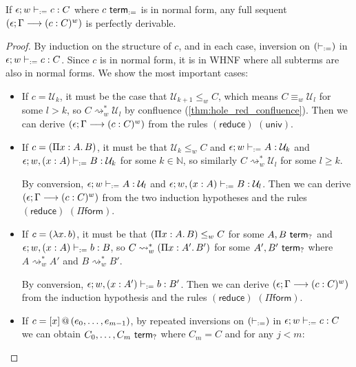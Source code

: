 \documentclass[twoside]{report}
\begin{document}
\begin{proposition}
    \label{thm:focused_calculus_completeness}
    If $\epsilon; w \vdash_{:=} c : C$ where $c \ \mathsf{term}_{:=}$ is in normal form, any full sequent $(\epsilon; \Gamma \longrightarrow (c : C)^w)$ is perfectly derivable.
\end{proposition}

\begin{proof}
    By induction on the structure of $c$, and in each case, inversion on $(\vdash_{:=})$ in $\epsilon; w \vdash_{:=} c : C$. Since $c$ is in normal form, it is in WHNF where all subterms are also in normal forms. We show the most important cases:

    \begin{itemize}
        \item If $c = \mathcal U_k$, it must be the case that $\mathcal U_{k + 1} \leq_w C$, which means $C \equiv_w \mathcal U_l$ for some $l > k$, so $C \rightsquigarrow_w^\ast \mathcal U_l$ by confluence (\cref{thm:hole_red_confluence}). Then we can derive $(\epsilon; \Gamma \longrightarrow (c : C)^w)$ from the rules $(\mathsf{reduce})$ $(\mathsf{univ})$.

        \item If $c = (\Pi{x} : {A}.\,{B})$, it must be that $\mathcal U_k \leq_w C$ and $\epsilon; w \vdash_{:=} A : \mathcal U_k$ and $\epsilon; w, (x : A) \vdash_{:=} B : \mathcal U_k$ for some $k \in \mathbb N$, so similarly $C \rightsquigarrow^\ast_w \mathcal U_l$ for some $l \geq k$.

              By conversion, $\epsilon; w \vdash_{:=} A : \mathcal U_l$ and $\epsilon; w, (x : A) \vdash_{:=} B : \mathcal U_l$. Then we can derive $(\epsilon; \Gamma \longrightarrow (c : C)^w)$ from the two induction hypotheses and the rules $(\mathsf{reduce})$ $(\Pi\mathsf{form})$.

        \item If $c = (\lambda{x}.\,{b})$, it must be that $(\Pi{x} : {A}.\,{B}) \leq_w C$ for some $A, B \ \mathsf{term}_{?}$ and $\epsilon; w, (x : A) \vdash_{:=} b : B$, so $C \rightsquigarrow^\ast_w (\Pi{x} : {A'}.\,{B'})$ for some $A', B' \ \mathsf{term}_{?}$ where $A \rightsquigarrow^\ast_w A'$ and $B \rightsquigarrow^\ast_w B'$.

              By conversion, $\epsilon; w, (x : A') \vdash_{:=} b : B'$. Then we can derive $(\epsilon; \Gamma \longrightarrow (c : C)^w)$ from the induction hypothesis and the rules $(\mathsf{reduce})$ $(\Pi\mathsf{form})$.

        \item If $c = {[x]}\,@\,({e_0, \ldots, e_{m-1}})$, by repeated inversions on $(\vdash_{:=})$ in $\epsilon; w \vdash_{:=} c : C$ we can obtain $C_0, \ldots, C_m \ \mathsf{term}_{?}$ where $C_m = C$ and for any $j < m$:


\end{itemize}
\end{proof}
\end{document}
